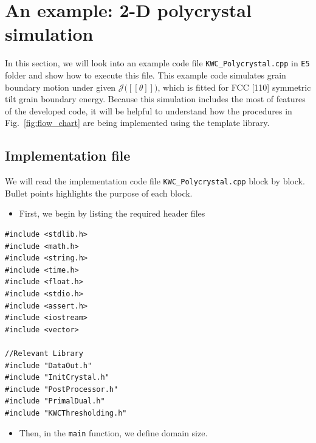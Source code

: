 \documentclass[11pt]{article}
\begin{document}
\section{An example: 2-D polycrystal simulation}
\label{sec:exampleCode}

In this section, we will look into an example code file 
\texttt{KWC\_Polycrystal.cpp} in \texttt{E5} folder
and show how to execute this file.
This example code simulates grain boundary motion under 
given $\mathcal{J}\big( [\![ \theta ]\!] \big)$,
which is fitted for FCC [110] symmetric tilt grain boundary energy. 
Because this simulation includes the most of features of
the developed code, it will be helpful to understand 
how the procedures in Fig.~\ref{fig:flow_chart} are being implemented 
using the template library. 


\subsection{Implementation file}

We will read the implementation code file \texttt{KWC\_Polycrystal.cpp} block by block. 
Bullet points highlights the purpose of each block.  

\begin{itemize} \item First, we begin by listing the required header files \end{itemize}
\begin{tcolorbox}
\begin{lstlisting}[basicstyle=\footnotesize]
#include <stdlib.h>
#include <math.h>
#include <string.h>
#include <time.h>
#include <float.h>
#include <stdio.h>
#include <assert.h>
#include <iostream>
#include <vector>

//Relevant Library
#include "DataOut.h"
#include "InitCrystal.h"
#include "PostProcessor.h"
#include "PrimalDual.h"
#include "KWCThresholding.h"
\end{lstlisting}
\end{tcolorbox}

\begin{itemize} \item Then, in the \texttt{main} function, 
we define domain size. \end{itemize}
\end{document}
